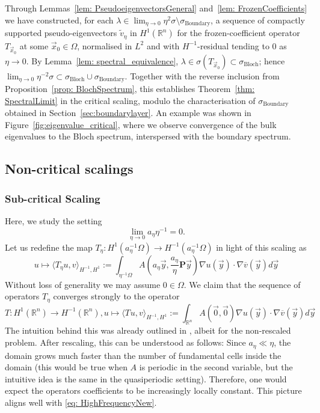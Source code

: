 \documentclass[a4paper,reqno]{amsart}
\numberwithin{equation}{section}
\numberwithin{equation}{section}		%
\numberwithin{figure}{section}			%
\numberwithin{table}{section}				%
\theoremstyle{definition}
\renewcommand{\tilde}{\widetilde}
\newcommand{\<}{\ensuremath \leq}
\renewcommand{\>}{\ensuremath \geq}
\renewcommand{\tilde}{\widetilde}
\def\e{\eta}
\begin{document}
Through Lemmas~\ref{lem: PseudoeigenvectorsGeneral} and~\ref{lem: FrozenCoefficients}
we have constructed, for each
$\lambda\in\lim_{\eta\to0}\eta^{2}\sigma\setminus\sigma_{\text{Boundary}}$, a
sequence of compactly supported pseudo-eigenvectors $\tilde v_\eta$ in $H^1(\mathbb{R}^n)$ for the
frozen-coefficient operator $T_{\vec x_0}$ at some $\vec x_0\in\Omega$,
normalised in $L^2$ and with $H^{-1}$-residual tending to $0$ as $\eta\to0$. By
Lemma~\ref{lem: spectral_equivalence}, $\lambda\in\sigma(T_{\vec x_0})\subset
\sigma_{\text{Bloch}}$; hence
$\lim_{\eta\to0}\eta^{-2}\sigma\subset\sigma_{\text{Bloch}}\cup
\sigma_{\text{Boundary}}$. Together with the reverse inclusion from
Proposition~\ref{prop: BlochSpectrum}, this establishes
Theorem~\ref{thm: SpectralLimit} in the critical scaling, modulo the
characterisation of $\sigma_{\text{Boundary}}$ obtained in
Section~\ref{sec:boundarylayer}. An example was shown in Figure~\ref{fig:eigenvalue_critical}, where we observe convergence of the bulk eigenvalues to the Bloch spectrum, interspersed with the boundary spectrum.

\subsection{Non-critical scalings}
\subsubsection{Sub-critical Scaling}
Here, we study the setting
\begin{equation*}
    \lim_{\e\rightarrow 0}a_\e\e^{-1}=0.
\end{equation*}
Let us redefine the map $T_\eta: H^1(a_{\eta}^{-1}\Omega)\rightarrow H^{-1}(a_\eta^{-1}\Omega)$ in light of this scaling as
 \begin{equation}
     u\mapsto \langle T_{\eta}u,v \rangle_{H^{-1},H^{1}}:=\int_{\eta^{-1}\Omega}A\left( a_\eta\vec{y}, \frac{a_\eta}{\eta}\textbf{P}\vec{y}\right)\nabla u(\vec{y}) \cdot \nabla \overline{v}(\vec{y}) d\vec{y}
 \end{equation}
Without loss of generality we may assume $0\in\Omega$. We claim that the sequence of operators $T_\e$ converges strongly to the operator
\begin{equation}\label{eq: SubCriticalLimit}
     T: H^1(\mathbb{R}^n)\rightarrow H^{-1}(\mathbb{R}^n), u\mapsto \langle T_{}u,v \rangle_{H^{-1},H^{1}}:=\int_{\mathbb{R}^n}A\left(\vec{0}, \vec{0}\right)\nabla u(\vec{y}) \cdot \nabla \overline{v}(\vec{y}) d\vec{y}
 \end{equation}
 The intuition behind this was already outlined in \cite{allaire1998bloch}, albeit for the non-rescaled problem. After rescaling, this can be understood as follows: Since $a_\eta \ll \eta$, the domain grows much faster than the number of fundamental cells inside the domain (this would be true when $A$ is periodic in the second variable, but the intuitive idea is the same in the quasiperiodic setting). Therefore, one would expect  the operators coefficients to be increasingly locally constant. This picture aligns well with \eqref{eq: HighFrequencyNew}.
\end{document}
